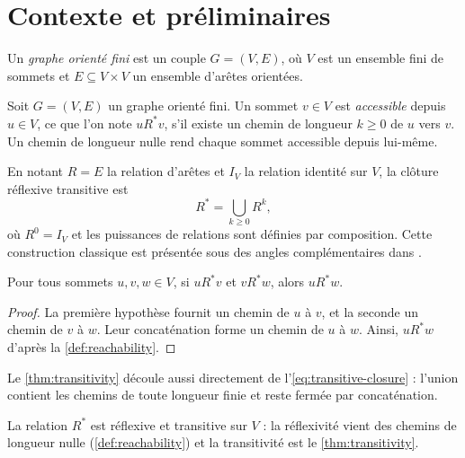 \chapter{Contexte et préliminaires}
\label{ch:background}


\begin{definition}
\label{def:directed-graph}
Un \emph{graphe orienté fini} est un couple $G=(V,E)$, où $V$ est un ensemble
fini de sommets et $E\subseteq V\times V$ un ensemble d'arêtes orientées.
\end{definition}

\begin{definition}[Accessibilité]
\label{def:reachability}
Soit $G=(V,E)$ un graphe orienté fini. Un sommet $v\in V$ est
\emph{accessible} depuis $u\in V$, ce que l'on note $u\mathrel{R^*}v$, s'il
existe un chemin de longueur $k\geq 0$ de $u$ vers $v$. Un chemin de longueur
nulle rend chaque sommet accessible depuis lui-même.
\end{definition}

En notant $R=E$ la relation d'arêtes et $I_V$ la relation identité sur $V$, la
clôture réflexive transitive est
\begin{equation}
  R^* = \bigcup_{k\geq 0} R^k,
  \label{eq:transitive-closure}
\end{equation}
où $R^0=I_V$ et les puissances de relations sont définies par composition. Cette
construction classique est présentée sous des angles complémentaires dans
\cite{diestel2017,cormen2022}.

\begin{theorem}
\label{thm:transitivity}
Pour tous sommets $u,v,w\in V$, si $u\mathrel{R^*}v$ et
$v\mathrel{R^*}w$, alors $u\mathrel{R^*}w$.
\end{theorem}

\begin{proof}
La première hypothèse fournit un chemin de $u$ à $v$, et la seconde un chemin
de $v$ à $w$. Leur concaténation forme un chemin de $u$ à $w$. Ainsi,
$u\mathrel{R^*}w$ d'après la \cref{def:reachability}.
\end{proof}

Le \cref{thm:transitivity} découle aussi directement de
l'\cref{eq:transitive-closure} : l'union contient les chemins de toute longueur
finie et reste fermée par concaténation.

\begin{corollary}
\label{cor:preorder}
La relation $R^*$ est réflexive et transitive sur $V$ : la réflexivité vient des
chemins de longueur nulle (\cref{def:reachability}) et la transitivité est le
\cref{thm:transitivity}.
\end{corollary}
